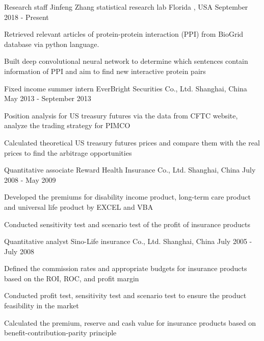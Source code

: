\begin{cventries}
    \cventry
      {Research staff}
      {Jinfeng Zhang statistical research lab}
      {Florida , USA}
      {September 2018 - Present}
      {
        \begin{cvitems}
          \item {Retrieved relevant articles of protein-protein interaction (PPI) from BioGrid database via python language.
          }
          \item {Built deep convolutional neural network to determine which sentences contain information of PPI and aim to find new interactive protein pairs}
        \end{cvitems}
      }

  \cventry
    {Fixed income summer intern}
    {EverBright Securities Co., Ltd.}
    {Shanghai, China}
    {May 2013 - September 2013}
    {
      \begin{cvitems}
        \item {Position analysis for US treasury futures via the data from CFTC website, analyze the trading strategy for PIMCO
        }
        \item {Calculated theoretical US treasury futures prices and compare them with the real prices to find the arbitrage opportunities}
      \end{cvitems}
    }
  \cventry
    {Quantitative associate}
    {Reward Health Insurance Co., Ltd.}
    {Shanghai, China}
    {July 2008 - May 2009}
    {
      \begin{cvitems}
        \item {Developed the premiums for disability income product, long-term care product and universal life product by EXCEL and
        VBA}
        \item {Conducted sensitivity test and scenario test of the profit of insurance products}
      \end{cvitems}
    }
    
 \cventry
    {Quantitative analyst}
    {Sino-Life insurance Co., Ltd.}
    {Shanghai, China}
    {July 2005 - July 2008}
    {
      \begin{cvitems}
        \item {Defined the commission rates and appropriate budgets for insurance products based on the ROI, ROC, and profit margin}
        \item{
        Conducted profit test, sensitivity test and scenario test to ensure the product feasibility in the market}
        \item{Calculated the
                premium, reserve and cash value for insurance products based on benefit-contribution-parity principle}
      \end{cvitems}
    }    
\end{cventries}
